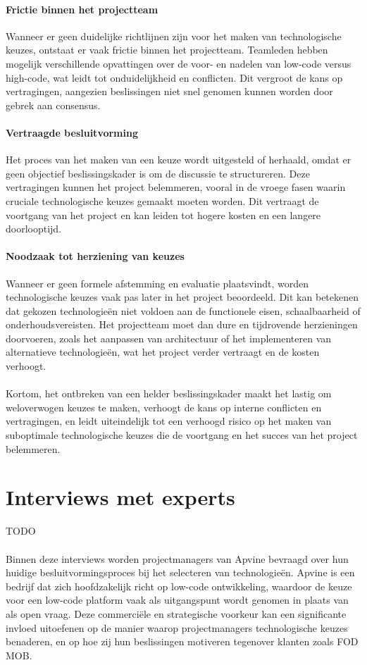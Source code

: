 \paragraph{Frictie binnen het projectteam}
Wanneer er geen duidelijke richtlijnen zijn voor het maken van technologische keuzes, ontstaat er vaak frictie binnen het projectteam. Teamleden hebben mogelijk verschillende opvattingen over de voor- en nadelen van low-code versus high-code, wat leidt tot onduidelijkheid en conflicten. Dit vergroot de kans op vertragingen, aangezien beslissingen niet snel genomen kunnen worden door gebrek aan consensus.
\paragraph{Vertraagde besluitvorming}
Het proces van het maken van een keuze wordt uitgesteld of herhaald, omdat er geen objectief beslissingskader is om de discussie te structureren. Deze vertragingen kunnen het project belemmeren, vooral in de vroege fasen waarin cruciale technologische keuzes gemaakt moeten worden. Dit vertraagt de voortgang van het project en kan leiden tot hogere kosten en een langere doorlooptijd.
\paragraph{Noodzaak tot herziening van keuzes}
Wanneer er geen formele afstemming en evaluatie plaatsvindt, worden technologische keuzes vaak pas later in het project beoordeeld. Dit kan betekenen dat gekozen technologieën niet voldoen aan de functionele eisen, schaalbaarheid of onderhoudsvereisten. Het projectteam moet dan dure en tijdrovende herzieningen doorvoeren, zoals het aanpassen van architectuur of het implementeren van alternatieve technologieën, wat het project verder vertraagt en de kosten verhoogt.
\\
\\
Kortom, het ontbreken van een helder beslissingskader maakt het lastig om weloverwogen keuzes te maken, verhoogt de kans op interne conflicten en vertragingen, en leidt uiteindelijk tot een verhoogd risico op het maken van suboptimale technologische keuzes die de voortgang en het succes van het project belemmeren.

\section{Interviews met experts}
TODO
\\
\\
Binnen deze interviews worden projectmanagers van Apvine bevraagd over hun huidige besluitvormingsproces bij het selecteren van technologieën. Apvine is een bedrijf dat zich hoofdzakelijk richt op low-code ontwikkeling, waardoor de keuze voor een low-code platform vaak als uitgangspunt wordt genomen in plaats van als open vraag. Deze commerciële en strategische voorkeur kan een significante invloed uitoefenen op de manier waarop projectmanagers technologische keuzes benaderen, en op hoe zij hun beslissingen motiveren tegenover klanten zoals \gls{FOD MOB}.

